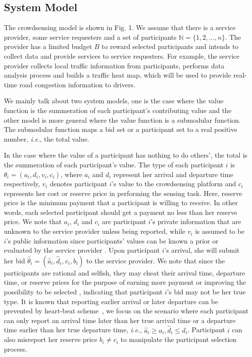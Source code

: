 \documentclass[conference,compsocconf,letterpaper,10pt]{IEEEtran}
\newcommand{\ie}{{\em i.e.}}
\begin{document}
\subsection{System Model}
The crowdsensing model is shown in Fig. 1. We assume that there is a service provider, some service requesters and a set of participants $\mathbb{N}=\{1,2,..., n\}.$ The provider has a limited budget $B$ to reward selected participants and intends to collect data and  provide services to service requesters. For example, the service provider collects local traffic information from participants, performs data analysis process and builds a traffic heat map, which will be used to provide real-time road congestion information to drivers.

We mainly talk about two system models, one is the case where the value function is the summeration of each participant's contributing value and the other model is more general where the value function is a submodular function. The submodular function maps a bid set or a participant set to a real positive number, \ie, the total value.

In the case where the value of a participant has nothing to do others', the total is the summeration of each participant's value. The type of each participant $i$ is $\theta_i=(a_i,d_i,v_i,c_i)$, where $a_i$ and $d_i$ represent her arrival and departure time respectively, $v_i$ denotes participant $i$'s value to the crowdsensing platform and $c_i$ represents her cost or reserve price in performing the sensing task. Here, reserve price is the minimum payment that a participant is willing to receive. In other words, each selected participant should get a payment no less than her reserve price. We note that $a_i$, $d_i$ and $c_i$ are participant $i$'s private information that are unknown to the service provider unless being reported, while $v_i$ is assumed to be $i$'s public information since participants' values can be known a prior or evaluated by the service provider \cite{peng2015pay,jin2015quality}. Upon participant $i$'s arrival, she will submit her bid $\hat{\theta}_i=(\hat{a}_i,\hat{d}_i,v_i,b_i)$ to the service provider. We note that since the participants are rational and selfish, they may cheat their arrival time, departure time, or reserve prices for the purpose of earning more payment or improving the possibility to be selected \cite{nisan2007algorithmic}, indicating that participant $i$'s bid may not be her true type. It is known that reporting earlier arrival or later departure can be prevented by heart-beat scheme~\cite{nisan2007algorithmic}, we focus on the scenario where each participant can only report an arrival time later than her true arrival time or a departure time earlier than her true departure time, \ie, $\hat{a}_i\ge a_i, \hat{d}_i\le d_i$. Participant $i$ can also misreport her reserve price $b_i \neq c_i$ to manipulate the participant selection process.
\end{document}
